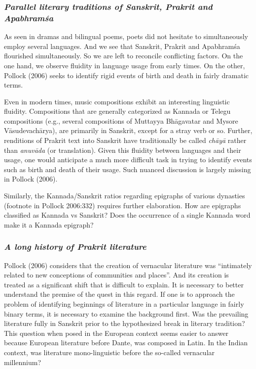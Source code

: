 \subsubsection{{\sl Parallel literary traditions of Sanskrit, Prakrit and Apabhramśa}}
\vskip -5pt

As seen in dramas and bilingual poems, poets did not hesitate to simultaneously employ several languages. And we see that Sanskrit, Prakrit and Apabhramśa flourished simultaneously. So we are left to reconcile conflicting factors. On the one hand, we observe fluidity in language usage from early times. On the other, Pollock (2006) seeks to identify rigid events of birth and death in fairly dramatic terms. 

Even in modern times, music compositions exhibit an interesting linguistic fluidity. Compositions that are generally categorized as Kannada or Telegu compositions (e.g., several compositions of Muttayya Bhāgavatar and Mysore Vāsudevachārya), are primarily in Sanskrit, except for a stray verb or so. Further, renditions of Prakrit text into Sanskrit have traditionally be called {\sl chāyā} rather than {\sl anuvāda} (or translation). Given this fluidity between languages and their usage, one would anticipate a much more difficult task in trying to identify events such as birth and death of their usage. Such nuanced discussion is largely missing in Pollock (2006). 

Similarly, the Kannada/Sanskrit ratios regarding epigraphs of various dynasties (footnote in Pollock 2006:332) requires further elaboration. How are epigraphs classified as Kannada vs Sanskrit? Does the occurrence of a single Kannada word make it a Kannada epigraph? 
\vskip -40pt

\subsubsection{{\sl A long history of Prakrit literature}}
\vskip -5pt

Pollock (2006) considers that the creation of vernacular literature was “intimately related to new conceptions of communities and places”. And its creation is treated as a significant shift that is difficult to explain. It is necessary to better understand the premise of the quest in this regard. If one is to approach the problem of identifying beginnings of literature in a particular language in fairly binary terms, it is necessary to examine the background first. Was the prevailing literature fully in Sanskrit prior to the hypothesized break in literary tradition? This question when posed in the European context seems easier to answer because European literature before Dante, was composed in Latin.  In the Indian context, was literature mono-linguistic before the so-called vernacular millennium? 

